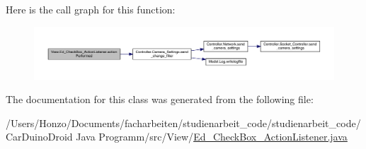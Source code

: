 Here is the call graph for this function\+:
\nopagebreak
\begin{figure}[H]
\begin{center}
\leavevmode
\includegraphics[width=350pt]{class_view_1_1_ed___check_box___action_listener_af33430df078ede5ecefcb8b700245737_cgraph}
\end{center}
\end{figure}




The documentation for this class was generated from the following file\+:\begin{DoxyCompactItemize}
\item 
/\+Users/\+Honzo/\+Documents/facharbeiten/studienarbeit\+\_\+code/studienarbeit\+\_\+code/\+Car\+Duino\+Droid Java Programm/src/\+View/\hyperlink{_ed___check_box___action_listener_8java}{Ed\+\_\+\+Check\+Box\+\_\+\+Action\+Listener.\+java}\end{DoxyCompactItemize}
